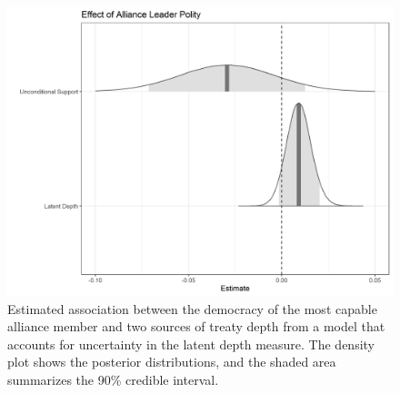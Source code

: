 \documentclass[12pt]{article}
\begin{document}
\begin{figure}
\includegraphics[width=.95\textwidth]{results-unc-depth.png}  
\caption{Estimated association between the democracy of the most capable alliance member and two sources of treaty depth from a model that accounts for uncertainty in the latent depth measure. The density plot shows the posterior distributions, and the shaded area summarizes the 90\% credible interval.}
\label{fig:results-unc-depth}
\end{figure}


\newpage

\singlespace
 
 
\end{document}
